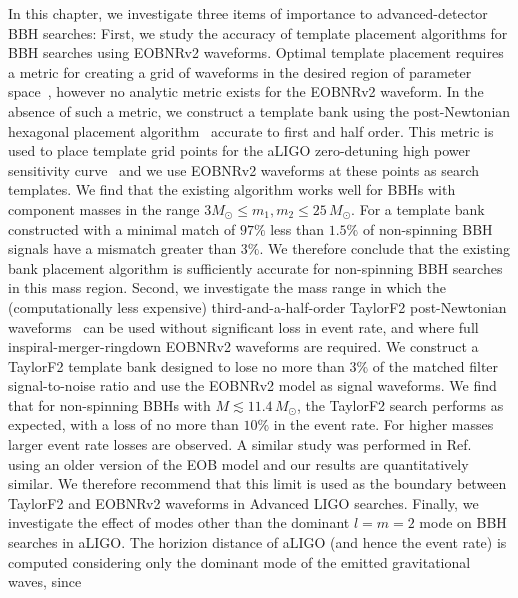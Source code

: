 In this chapter, we investigate three items of importance to advanced-detector
BBH searches: First, we study the accuracy of template placement algorithms
for BBH searches using EOBNRv2 waveforms. Optimal template placement requires
a metric for creating a grid of waveforms in the desired region of parameter
space~\cite{OwenTemplateSpacing}, however no analytic metric exists for the
EOBNRv2 waveform. In the absence of such a metric, we construct a template
bank using the post-Newtonian hexagonal placement algorithm~\cite{SathyaBankPlacementTauN,
BabaketalBankPlacement,SathyaMetric2PN,Cokelaer:2007kx} accurate to first and
half order.
This metric is used to place template grid points for the aLIGO zero-detuning
high power sensitivity curve~\cite{aLIGONoiseCurve} and we use EOBNRv2
waveforms at these points as search templates.  We find that the existing
algorithm works well for BBHs with component masses in the range $3 M_\odot
\le m_1, m_2 \le 25\, M_\odot$.  For a template bank constructed with a
minimal match of $97\%$ less than $1.5\%$ of non-spinning BBH signals have a
mismatch greater than $3\%$. We therefore conclude that the existing bank
placement algorithm is sufficiently accurate for non-spinning BBH searches in
this mass region.  Second, we investigate the mass range in which the
(computationally less expensive) third-and-a-half-order TaylorF2
post-Newtonian
waveforms~\cite{Sathyaprakash:1991mt,Cutler:1994ys,Droz:1999qx,Blanchet:2004ek,Blanchet:2004bb,Jaranowski:1999qd,Jaranowski:1999ye,Damour:2001bu,Kidder:2007rt,Blanchet3PN}
can be used without significant loss in event rate, and where full
inspiral-merger-ringdown EOBNRv2 waveforms are required. We construct a
TaylorF2 template bank designed to lose no more than $3\%$ of the matched
filter signal-to-noise ratio and use the EOBNRv2 model as signal waveforms.
We find that for non-spinning BBHs with $M \lesssim 11.4\,M_{\odot}$, the
TaylorF2 search performs as expected, with a loss of no more than $10\%$ in
the event rate. For higher masses larger event rate losses are observed. A
similar study was performed in Ref.~\cite{CompTemplates2009} using an older
version of the EOB model and our results are quantitatively similar. We
therefore recommend that this limit is used as the boundary between TaylorF2
and EOBNRv2 waveforms in Advanced LIGO searches.  Finally, we investigate the
effect of modes other than the dominant $l = m = 2$ mode on BBH searches in
aLIGO.  The horizion distance of aLIGO (and hence the event rate) is computed
considering only the dominant mode of the emitted gravitational waves, since
